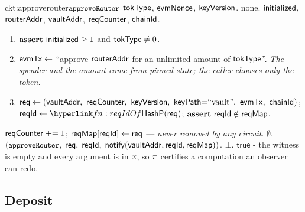 \begin{CktBox}{ckt:approverouter}{$\texttt{\small approveRouter}$}
 $\mathsf{tokType}$, $\mathsf{evmNonce}$, $\mathsf{keyVersion}$.
 none.
 $\mathsf{initialized}$, $\mathsf{routerAddr}$, $\mathsf{vaultAddr}$, $\mathsf{reqCounter}$, $\mathsf{chainId}$.
\begin{enumerate}[nosep,leftmargin=1.7em,topsep=2pt]
\item $\textbf{assert}~ \mathsf{initialized} \geq 1$ and $\mathsf{tokType} \neq 0$.
\item $\mathsf{evmTx} \gets$ ``approve $\mathsf{routerAddr}$ for an unlimited amount of $\mathsf{tokType}$''. \emph{The
      spender and the amount come from pinned state; the caller chooses only the token.}
\item $\req \gets (\vaultAddr\bc \sigNonce\bc \keyVer\bc \keyPath{=}\keyPathLit\bc \evmTxOf\bc
      \chainId)$; \; $\rid \gets \lnk{fn:reqIdOf}{\reqIdOf(\req)}$; \;
      $\textbf{assert}~ \mathsf{reqId} \notin \mathsf{reqMap}$.
\end{enumerate}
\begin{OutList}
\oitem{\Dvault} $\mathsf{reqCounter} \mathrel{+}= 1$; \; $\mathsf{reqMap}[\mathsf{reqId}] \gets \mathsf{req}$ ---
  \emph{never removed by any circuit}.
\oitem{\Dshd} $\emptyset$.
\oitem{\stmt} $(\texttt{\small approveRouter},\; \mathsf{req},\; \mathsf{reqId},\; \mathsf{notify}(\mathsf{vaultAddr}, \mathsf{reqId}, \mathsf{reqMap}))$.
\oitem{\wit} $\bot$.
\oitem{\Rel} $\mathsf{true}$ - the witness is empty and every argument is in $x$, so
  $\pi$ certifies a computation an observer can redo.
\end{OutList}
\end{CktBox}

\subsection{Deposit}
\label{ssec:depinst2}

